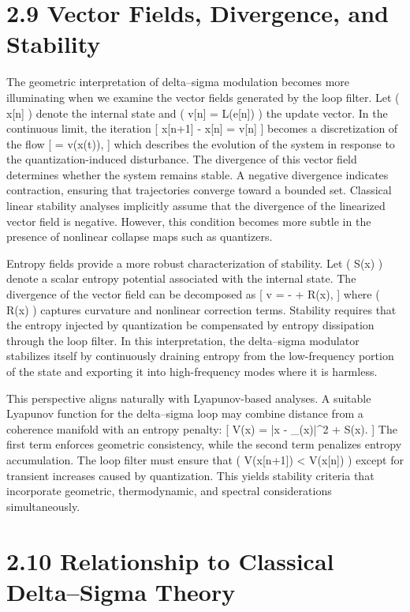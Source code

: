 \section*{2.9 Vector Fields, Divergence, and Stability}

The geometric interpretation of delta--sigma modulation becomes more illuminating when we examine the vector fields generated by the loop filter. Let ( x[n] ) denote the internal state and ( v[n] = L(e[n]) ) the update vector. In the continuous limit, the iteration
[
x[n+1] - x[n] = v[n]
]
becomes a discretization of the flow
[
 = v(x(t)),
]
which describes the evolution of the system in response to the quantization-induced disturbance. The divergence of this vector field determines whether the system remains stable. A negative divergence indicates contraction, ensuring that trajectories converge toward a bounded set. Classical linear stability analyses implicitly assume that the divergence of the linearized vector field is negative. However, this condition becomes more subtle in the presence of nonlinear collapse maps such as quantizers.

Entropy fields provide a more robust characterization of stability. Let ( S(x) ) denote a scalar entropy potential associated with the internal state. The divergence of the vector field can be decomposed as
[
\nabla \cdot v = - + R(x),
]
where ( R(x) ) captures curvature and nonlinear correction terms. Stability requires that the entropy injected by quantization be compensated by entropy dissipation through the loop filter. In this interpretation, the delta--sigma modulator stabilizes itself by continuously draining entropy from the low-frequency portion of the state and exporting it into high-frequency modes where it is harmless.

This perspective aligns naturally with Lyapunov-based analyses. A suitable Lyapunov function for the delta--sigma loop may combine distance from a coherence manifold with an entropy penalty:
[
V(x) = |x - \Pi_{}(x)|^2 + \alpha S(x).
]
The first term enforces geometric consistency, while the second term penalizes entropy accumulation. The loop filter must ensure that ( V(x[n+1]) < V(x[n]) ) except for transient increases caused by quantization. This yields stability criteria that incorporate geometric, thermodynamic, and spectral considerations simultaneously.

\section*{2.10 Relationship to Classical Delta--Sigma Theory}

